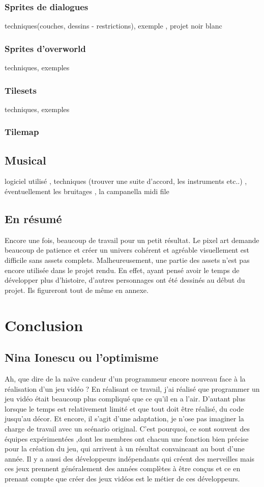 \documentclass[11pt]{article}
\begin{document}
\subsubsection{Sprites de dialogues}
techniques(couches, dessins - restrictions), exemple , projet noir blanc
\subsubsection{Sprites d'overworld}
techniques, exemples
\subsubsection{Tilesets}
techniques, exemples
\subsubsection{Tilemap}
\subsection{Musical}
logiciel utilisé , techniques (trouver une suite d'accord, les instruments etc..) , éventuellement les bruitages , la campanella midi file
\subsection{En résumé}
Encore une fois, beaucoup de travail pour un petit résultat. Le pixel art demande beaucoup de patience et créer un univers cohérent et agréable visuellement est difficile sans assets complets. Malheureusement, une partie des assets n'est pas encore utilisée dans le projet rendu. En effet, ayant pensé avoir le temps de développer plus d'histoire, d'autres personnages ont été dessinés au début du projet. Ils figureront tout de même en annexe.
\section{Conclusion}
\subsection{Nina Ionescu ou l'optimisme} 
Ah, que dire de la naïve candeur d'un programmeur encore nouveau face à la réalisation d'un jeu vidéo ? En réalisant ce travail, j'ai réalisé que programmer un jeu vidéo était beaucoup plus compliqué que ce qu'il en a l'air. D'autant plus lorsque le temps est relativement limité et que tout doit être réalisé, du code jusqu'au décor. Et encore, il s'agit d'une adaptation, je n'ose pas imaginer la charge de travail avec un scénario original. C'est pourquoi, ce sont souvent des équipes expérimentées ,dont les membres ont chacun une fonction bien précise pour la création du jeu, qui arrivent à un résultat convaincant au bout d'une année. Il y a aussi des développeurs indépendants qui créent des merveilles mais ces jeux prennent généralement des années complètes à être conçus et ce en prenant compte que créer des jeux vidéos est le métier de ces développeurs. \\
\end{document}
